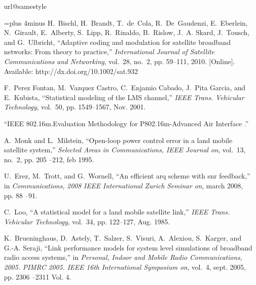 \documentclass[journal,onecolumn,10pt,a4paper]{IEEEtran}
\begin{document}
\begin{thebibliography}{10}
\providecommand{\url}[1]{#1}
\csname url@samestyle\endcsname
\providecommand{\newblock}{\relax}
\providecommand{\bibinfo}[2]{#2}
\providecommand{\BIBentrySTDinterwordspacing}{\spaceskip=0pt\relax}
\providecommand{\BIBentryALTinterwordstretchfactor}{4}
\providecommand{\BIBentryALTinterwordspacing}{\spaceskip=\fontdimen2\font plus
\BIBentryALTinterwordstretchfactor\fontdimen3\font minus
  \fontdimen4\font\relax}
\providecommand{\BIBforeignlanguage}[2]{{\expandafter\ifx\csname l@#1\endcsname\relax
\typeout{** WARNING: IEEEtran.bst: No hyphenation pattern has been}\typeout{** loaded for the language `#1'. Using the pattern for}\typeout{** the default language instead.}\else
\language=\csname l@#1\endcsname
\fi
#2}}
\providecommand{\BIBdecl}{\relax}
\BIBdecl

\BIBentryALTinterwordspacing
H.~Bischl, H.~Brandt, T.~de~Cola, R.~De~Gaudenzi, E.~Eberlein, N.~Girault,
  E.~Alberty, S.~Lipp, R.~Rinaldo, B.~Rislow, J.~A. Skard, J.~Tousch, and
  G.~Ulbricht, ``Adaptive coding and modulation for satellite broadband
  networks: From theory to practice,'' \emph{International Journal of Satellite
  Communications and Networking}, vol.~28, no.~2, pp. 59--111, 2010. [Online].
  Available: \url{http://dx.doi.org/10.1002/sat.932}
\BIBentrySTDinterwordspacing

F.~{Perez Fontan}, M.~{Vazquez Castro}, C.~{Enjamio Cabado}, J.~{Pita Garcia},
  and E.~Kubista, ``{Statistical modeling of the LMS channel},'' \emph{IEEE
  Trans. Vehicular Technology}, vol.~50, pp. 1549--1567, Nov. 2001.

``{IEEE 802.16m.Evaluation Methodology for P802.16m-Advanced Air Interface }.''

A.~Monk and L.~Milstein, ``Open-loop power control error in a land mobile
  satellite system,'' \emph{Selected Areas in Communications, IEEE Journal on},
  vol.~13, no.~2, pp. 205 --212, feb 1995.

U.~Erez, M.~Trott, and G.~Wornell, ``An efficient arq scheme with snr
  feedback,'' in \emph{Communications, 2008 IEEE International Zurich Seminar
  on}, march 2008, pp. 88 --91.

C.~Loo, ``A statistical model for a land mobile satellite link,'' \emph{IEEE
  Trans. Vehicular Technology}, vol.~34, pp. 122--127, Aug. 1985.

K.~Brueninghaus, D.~Astely, T.~Salzer, S.~Visuri, A.~Alexiou, S.~Karger, and
  G.-A. Seraji, ``Link performance models for system level simulations of
  broadband radio access systems,'' in \emph{Personal, Indoor and Mobile Radio
  Communications, 2005. PIMRC 2005. IEEE 16th International Symposium on},
  vol.~4, sept. 2005, pp. 2306 --2311 Vol. 4.


\end{thebibliography}
\end{document}
